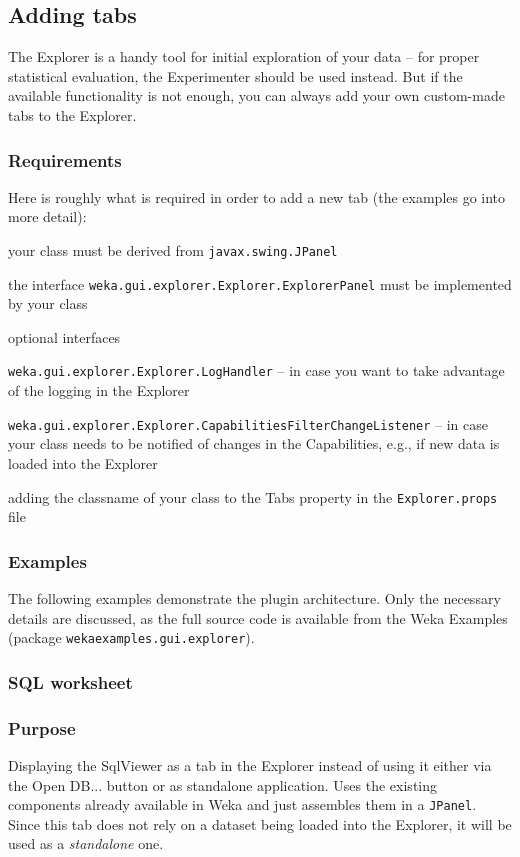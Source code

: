 \subsection{Adding tabs}
The Explorer is a handy tool for initial exploration of your data -- for
proper statistical evaluation, the Experimenter should be used instead. But if
the available functionality is not enough, you can always add your own
custom-made tabs to the Explorer.

\subsubsection{Requirements}
Here is roughly what is required in order to add a new tab (the examples go into
more detail):
\begin{tight_itemize}
  \item your class must be derived from \texttt{javax.swing.JPanel}
  \item the interface \texttt{weka.gui.explorer.Explorer.ExplorerPanel} must be
implemented by your class
  \item optional interfaces
  \begin{tight_itemize}
	\item \texttt{weka.gui.explorer.Explorer.LogHandler} -- in case
you want to take advantage of the logging in the Explorer
	\item \texttt{weka.gui.explorer.Explorer.CapabilitiesFilterChangeListener}
-- in case your class needs to be notified of changes in the
Capabilities, e.g., if new data is loaded into the Explorer
  \end{tight_itemize}
  \item adding the classname of your class to the Tabs property in the
\texttt{Explorer.props} file
\end{tight_itemize}

\subsubsection{Examples}
The following examples demonstrate the plugin architecture. Only the
necessary details are discussed, as the full source code is available from the
Weka Examples \cite{wekaexamples} (package \texttt{wekaexamples.gui.explorer}).

\subsubsection*{SQL worksheet}
\subsubsection*{Purpose}
Displaying the SqlViewer as a tab in the Explorer instead of using it either via
the Open DB... button or as standalone application. Uses the existing components
already available in Weka and just assembles them in a \texttt{JPanel}. Since
this tab does not rely on a dataset being loaded into the Explorer, it will be
used as a \textit{standalone} one.

